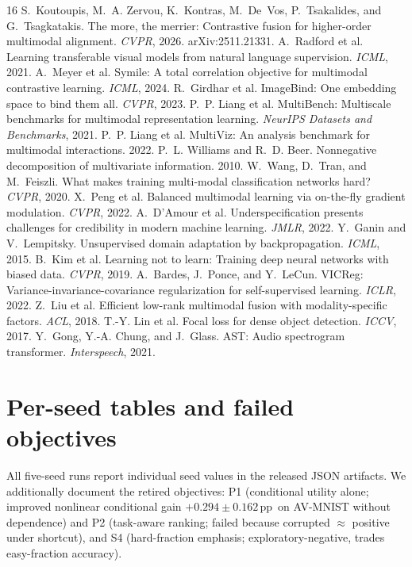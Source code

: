 \documentclass[10pt,twocolumn,letterpaper]{article}
\newcommand{\pp}{\,pp}
\begin{document}
{\small

\begin{thebibliography}{16}\itemsep1pt
 S.~Koutoupis, M.~A. Zervou, K.~Kontras, M.~De~Vos, P.~Tsakalides, and
G.~Tsagkatakis. The more, the merrier: Contrastive fusion for higher-order multimodal alignment.
\emph{CVPR}, 2026. arXiv:2511.21331.
 A.~Radford et al. Learning transferable visual models from natural language
supervision. \emph{ICML}, 2021.
 A.~Meyer et al. Symile: A total correlation objective for multimodal
contrastive learning. \emph{ICML}, 2024.
 R.~Girdhar et al. ImageBind: One embedding space to bind them all.
\emph{CVPR}, 2023.
 P.~P. Liang et al. MultiBench: Multiscale benchmarks for multimodal
representation learning. \emph{NeurIPS Datasets and Benchmarks}, 2021.
 P.~P. Liang et al. MultiViz: An analysis benchmark for multimodal
interactions. 2022.
 P.~L. Williams and R.~D. Beer. Nonnegative decomposition of multivariate
information. 2010.
 W.~Wang, D.~Tran, and M.~Feiszli. What makes training multi-modal
classification networks hard? \emph{CVPR}, 2020.
 X.~Peng et al. Balanced multimodal learning via on-the-fly gradient modulation.
\emph{CVPR}, 2022.
 A.~D'Amour et al. Underspecification presents challenges for credibility in
modern machine learning. \emph{JMLR}, 2022.
 Y.~Ganin and V.~Lempitsky. Unsupervised domain adaptation by backpropagation.
\emph{ICML}, 2015.
 B.~Kim et al. Learning not to learn: Training deep neural networks
with biased data. \emph{CVPR}, 2019.
 A.~Bardes, J.~Ponce, and Y.~LeCun. VICReg: Variance-invariance-covariance
regularization for self-supervised learning. \emph{ICLR}, 2022.
 Z.~Liu et al. Efficient low-rank multimodal fusion with modality-specific factors.
\emph{ACL}, 2018.
 T.-Y. Lin et al. Focal loss for dense object detection. \emph{ICCV}, 2017.
 Y.~Gong, Y.-A. Chung, and J.~Glass. AST: Audio spectrogram transformer.
\emph{Interspeech}, 2021.
\end{thebibliography}
}

\appendix
\section{Per-seed tables and failed objectives}
All five-seed runs report individual seed values in the released JSON artifacts. We additionally
document the retired objectives: P1 (conditional utility alone; improved nonlinear conditional
gain $+0.294{\pm}0.162$\pp\ on AV-MNIST without dependence) and P2 (task-aware ranking; failed
because corrupted $\approx$ positive under shortcut), and S4 (hard-fraction emphasis;
exploratory-negative, trades easy-fraction accuracy).
\end{document}
